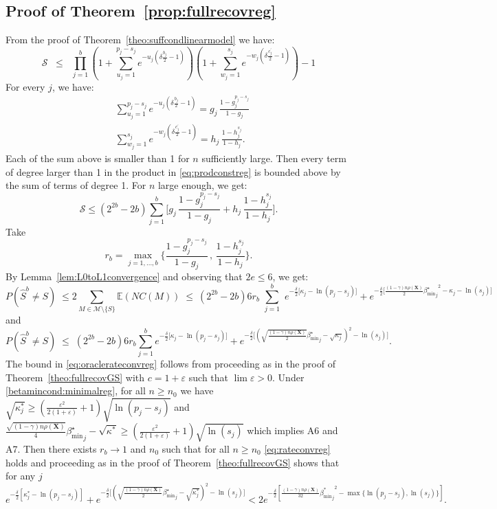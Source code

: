 \documentclass[aos]{imsart}
\theoremstyle{plain}
\newcommand{\E}{\mathbb{E}}
\newcommand{\M}{\mathcal{M}}
\newcommand{\bs}{\boldsymbol}
\begin{document}
\subsection{Proof of Theorem~\ref{prop:fullrecovreg}}
From the proof of Theorem~\ref{theo:suffcondlinearmodel} we have:
\begin{equation}\label{eq:prodconstreg}
    \mathcal{S} \;\;\leq\;\; \prod_{j=1}^b\left(1+\sum_{u_j=1}^{p_j-s_j}e^{-u_j\left(\delta \tfrac{b_j}{2}-1\right)}\right)\left(1+
    \sum_{w_j=1}^{s_j}    e^{-w_j\left(\delta \tfrac{c^{\prime}_j}{2}-1\right)}\right) - 1
\end{equation}
For every $j$, we have:
\begin{align*}
    &\sum_{u_j=1}^{p_j-s_j}e^{-u_j\left(\delta \tfrac{b_j}{2}-1\right)}
    =g_j\,\frac{1-g_j^{p_j-s_j}}{1-g_j} \\
    &\sum_{w_j=1}^{s_j}    e^{-w_j\left(\delta \tfrac{c^{\prime}_j}{2}-1\right)} =h_j\,\frac{1-h_j^{s_j}}{1-h_j}.
\end{align*}
Each of the sum above is smaller than 1 for $n$ sufficiently large. Then every term of degree larger than 1 in the product in \eqref{eq:prodconstreg} is bounded above by the sum of terms of degree 1. For $n$ large enough, we get: 
 \begin{equation*} \mathcal{S} \leq (2^{2b}-2b)\sum_{j=1}^b \bigg[g_j\,\frac{1-g_j^{p_j-s_j}}{1-g_j}+ h_j\,\frac{1-h_j^{s_j}}{1-h_j}\bigg ]. \end{equation*} 
 Take $$r_b=\max_{j=1,\ldots,b}\bigg\{\frac{1-g_j^{p_j-s_j}}{1-g_j} \,,\,\frac{1-h_j^{s_j}}{1-h_j} \bigg\}.$$
 By Lemma~\ref{lem:L0toL1convergence} and observing that $2e \leq 6$, we get: 
 $$ P(\hat{S}^{b} \neq S)\;\leq  2 \sum_{M \in \M\setminus \{S\}} \E\left(NC(M)\right) \;\leq\ (2^{2b}-2b)6r_b\,\,\sum_{j=1}^b\,\, e^{-\tfrac{\delta}{2}\big[\kappa_j-\ln(p_j-s_j)\big]} + e^{-\tfrac{\delta}{2}\big[\frac{(1-\gamma) n\rho(\bs X)}{2}{{\beta_{\min}^{\star}}_j}^2 - \kappa_j -\ln(s_j) \big]} $$ and 
 $$ P(\hat{S}^{b} \neq S)\;\leq \;(2^{2b}-2b)6r_b\sum_{j=1}^b e^{-\tfrac{\delta}{2}\big[\kappa_j-\ln(p_j-s_j)\big]} + e^{-\frac{\delta}{2}\big[(\sqrt{\frac{(1-\gamma) n\rho(\bs X)}{2}}{{\beta_{\min}^{\star}}_j} - \sqrt{\kappa_j})^2 -\ln(s_j) \big]}.$$
     The bound in \eqref{eq:oraclerateconvreg} follows from proceeding as in the proof of Theorem~\ref{theo:fullrecovGS} with $c=1+\varepsilon$ such that $\lim \varepsilon > 0$. Under \eqref{betamincond:minimalreg}, for all $n\geq n_0$  we have $\sqrt{\kappa^*_j} \geq  (\frac{\varepsilon^2}{2(1+\varepsilon)}+1)\sqrt{\ln(p_j-s_j)}$ and $\frac{\sqrt{(1-\gamma) n\rho(\bs X)}}{4}{{\beta_{\min}^{\star}}_j}-\sqrt{\kappa^*} \geq (\frac{\varepsilon^2}{2(1+\varepsilon)}+1)\sqrt{\ln(s_j)}$
    which implies A6 and A7. Then there exists $r_b\to 1$ and $n_0$ such that for all $n\geq n_0$ \eqref{eq:rateconvreg} holds and proceeding as in the proof of Theorem~\ref{theo:fullrecovGS} shows that for any $j$ 
    $$e^{-\frac{\delta}{2}\left[{\kappa^*_j}-\ln(p_j-s_j)\right]}+e^{-\frac{\delta}{2}\big[(\sqrt{\frac{(1-\gamma) n\rho(\bs X)}{2}}{{\beta_{\min}^{\star}}_j} - \sqrt{\kappa_j^*})^2 -\ln(s_j) \big]} <2 e^{-\frac{\delta}{2}[\frac{(1-\gamma) n\rho(\bs X)}{32}{{\beta_{\min}^*}_j}^2-\max\{\ln(p_j-s_j),\ln(s_j)\}]}. $$
\end{document}
